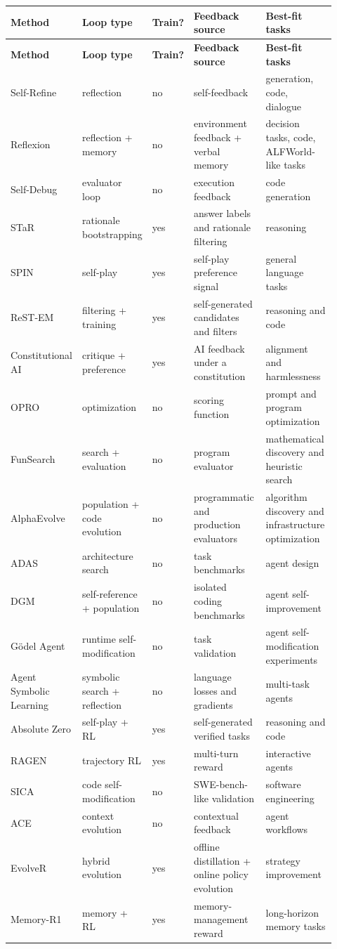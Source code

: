 {\TableTight
\begin{longtable}{@{}L{0.17\linewidth}L{0.16\linewidth}L{0.10\linewidth}L{0.25\linewidth}L{0.24\linewidth}@{}}
\toprule
\textbf{Method} & \textbf{Loop type} & \textbf{Train?} & \textbf{Feedback source} & \textbf{Best-fit tasks} \\
\midrule
\endfirsthead
\toprule
\textbf{Method} & \textbf{Loop type} & \textbf{Train?} & \textbf{Feedback source} & \textbf{Best-fit tasks} \\
\midrule
\endhead
\bottomrule
\endlastfoot
Self-Refine & reflection & no & self-feedback & generation, code, dialogue \\
Reflexion & reflection + memory & no & environment feedback + verbal memory & decision tasks, code, ALFWorld-like tasks \\
Self-Debug & evaluator loop & no & execution feedback & code generation \\
STaR & rationale bootstrapping & yes & answer labels and rationale filtering & reasoning \\
SPIN & self-play & yes & self-play preference signal & general language tasks \\
ReST-EM & filtering + training & yes & self-generated candidates and filters & reasoning and code \\
Constitutional AI & critique + preference & yes & AI feedback under a constitution & alignment and harmlessness \\
OPRO & optimization & no & scoring function & prompt and program optimization \\
FunSearch & search + evaluation & no & program evaluator & mathematical discovery and heuristic search \\
AlphaEvolve & population + code evolution & no & programmatic and production evaluators & algorithm discovery and infrastructure optimization \\
ADAS & architecture search & no & task benchmarks & agent design \\
DGM & self-reference + population & no & isolated coding benchmarks & agent self-improvement \\
G\"{o}del Agent & runtime self-modification & no & task validation & agent self-modification experiments \\
Agent Symbolic Learning & symbolic search + reflection & no & language losses and gradients & multi-task agents \\
Absolute Zero & self-play + RL & yes & self-generated verified tasks & reasoning and code \\
RAGEN & trajectory RL & yes & multi-turn reward & interactive agents \\
SICA & code self-modification & no & SWE-bench-like validation & software engineering \\
ACE & context evolution & no & contextual feedback & agent workflows \\
EvolveR & hybrid evolution & yes & offline distillation + online policy evolution & strategy improvement \\
Memory-R1 & memory + RL & yes & memory-management reward & long-horizon memory tasks \\
\end{longtable}}

